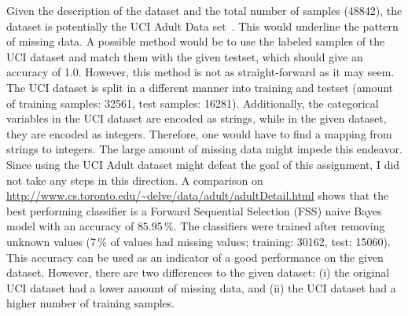 Given the description of the dataset and the total number of samples (48842), the dataset is potentially the UCI Adult Data set~\cite{lichman2013}. This would underline the pattern of missing data. A possible method would be to use the labeled samples of the UCI dataset and match them with the given testset, which should give an accuracy of 1.0. However, this method is not as straight-forward as it may seem. The UCI dataset is split in a different manner into training and testset (amount of training samples: 32561, test samples: 16281). Additionally, the categorical variables in the UCI dataset are encoded as strings, while in the given dataset, they are encoded as integers. Therefore, one would have to find a mapping from strings to integers. The large amount of missing data might impede this endeavor. Since using the UCI Adult dataset might defeat the goal of this assignment, I did not take any steps in this direction. A comparison on \url{http://www.cs.toronto.edu/~delve/data/adult/adultDetail.html} shows that the best performing classifier is a Forward Sequential Selection (FSS) naive Bayes model with an accuracy of $85.95\,\%$. The classifiers were trained after removing unknown values (7\,\% of values had missing values; training: 30162, test: 15060). This accuracy can be used as an indicator of a good performance on the given dataset. However, there are two differences to the given dataset: (i) the original UCI dataset had a lower amount of missing data, and (ii) the UCI dataset had a higher number of training samples.